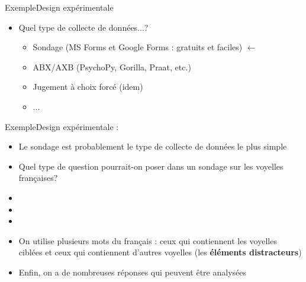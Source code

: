 \documentclass[xcolor=dvipsnames, onlymath, 10pt, aspectratio=169, handout]{beamer}
\begin{document}
\begin{frame}{Exemple}{Design expérimentale}

	\begin{itemize}
		\item Quel type de collecte de données...?
		      \begin{itemize}

			      \item Sondage (MS Forms et Google Forms : gratuits et faciles) $\leftarrow$ 
			            \pause
			      \item ABX/AXB (PsychoPy, Gorilla, Praat, etc.)
			            \pause
			      \item Jugement à choix forcé (idem)
			      \item ...

		      \end{itemize}
	\end{itemize}

\end{frame}


\begin{frame}{Exemple}{Design expérimentale : }

	\begin{itemize}
		\item Le sondage est probablement le type de collecte de données le plus simple
		\item[\winner] Quel type de question pourrait-on poser dans un sondage sur les voyelles françaises?

		      \pause
		\item[]
		\item[] 
		\item[]

		      \pause

		\item On utilise plusieurs mots du français : ceux qui contiennent les voyelles ciblées et ceux qui contiennent d'autres voyelles (les \textbf{éléments distracteurs})
		\item[\winner] Enfin, on a de nombreuses réponses qui peuvent être analysées
	\end{itemize}

\end{frame}


\end{document}
